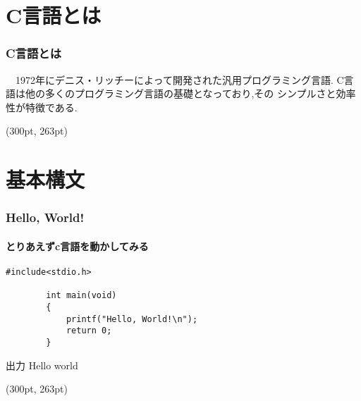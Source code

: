 \documentclass[dvipdfmx]{beamer}
\begin{document}
\section{C言語とは}
\begin{frame}[c, fragile, label=9]
    \frametitle{C言語とは}
    　1972年にデニス・リッチーによって開発された汎用プログラミング言語.
    C言語は他の多くのプログラミング言語の基礎となっており,その
    シンプルさと効率性が特徴である.
    \begin{textblock*}{0.3\linewidth}(300pt, 263pt)
    \hyperlink{8}{}
    \space
    \hyperlink{10}{}
    \end{textblock*}
\end{frame}

\section{基本構文}
\begin{frame}[c, fragile, label=10]
    \frametitle{Hello, World!}
    \framesubtitle{とりあえずc言語を動かしてみる}
    \begin{lstlisting}[gobble=8, caption=hello.c, label=hello]
        #include<stdio.h>

        int main(void)
        {
            printf("Hello, World!\n");
            return 0;
        }
    \end{lstlisting}
    \begin{block}{出力}
        Hello world
    \end{block}
    \begin{textblock*}{0.3\linewidth}(300pt, 263pt)
    \hyperlink{9}{}
    \space
    \hyperlink{11}{}
    \end{textblock*}
\end{frame}
\end{document}
